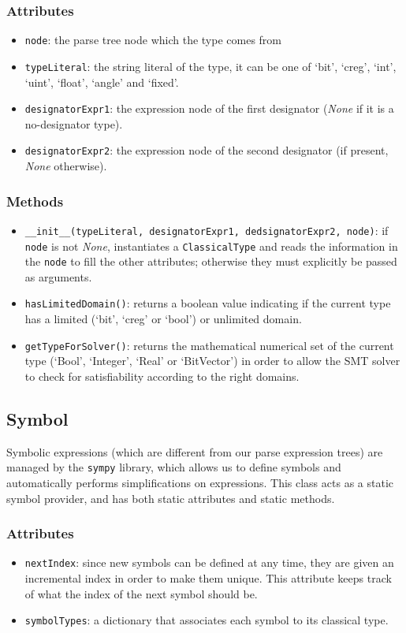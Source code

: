 \documentclass[12pt,a4paper]{report}
\theoremstyle{definition}
\theoremstyle{definition}
\theoremstyle{definition}
\begin{document}
\subsubsection{Attributes}
\begin{itemize}
    \itemsep 0em
    \item \texttt{node}: the parse tree node which the type comes from
    \item \texttt{typeLiteral}: the string literal of the type, it can be one of `bit', `creg', `int', `uint', `float', `angle' and `fixed'.
    \item \texttt{designatorExpr1}: the expression node of the first designator (\textit{None} if it is a no-designator type).
    \item \texttt{designatorExpr2}: the expression node of the second designator (if present, \textit{None} otherwise).
\end{itemize}
\subsubsection{Methods}
\begin{itemize}
    \itemsep 0em
    \item \texttt{\_\_init\_\_(typeLiteral, designatorExpr1, dedsignatorExpr2, node)}: if \texttt{node} is not \textit{None}, instantiates a \texttt{ClassicalType} and reads the information in the \texttt{node} to fill the other attributes; otherwise they must explicitly be passed as arguments.
    \item \texttt{hasLimitedDomain()}: returns a boolean value indicating if the current type has a limited (`bit', `creg' or `bool') or unlimited domain.
    \item \texttt{getTypeForSolver()}: returns the mathematical numerical set of the current type (`Bool', `Integer', `Real' or `BitVector') in order to allow the SMT solver to check for satisfiability according to the right domains.
\end{itemize}

\subsection{Symbol}
Symbolic expressions (which are different from our parse expression trees) are managed by the \texttt{sympy} library, which allows us to define symbols and automatically performs simplifications on expressions.
This class acts as a static symbol provider, and has both static attributes and static methods.
\subsubsection{Attributes}
\begin{itemize}
    \itemsep 0em
    \item \texttt{nextIndex}: since new symbols can be defined at any time, they are given an incremental index in order to make them unique. This attribute keeps track of what the index of the next symbol should be.
    \item \texttt{symbolTypes}: a dictionary that associates each symbol to its classical type.
\end{itemize}
\end{document}
